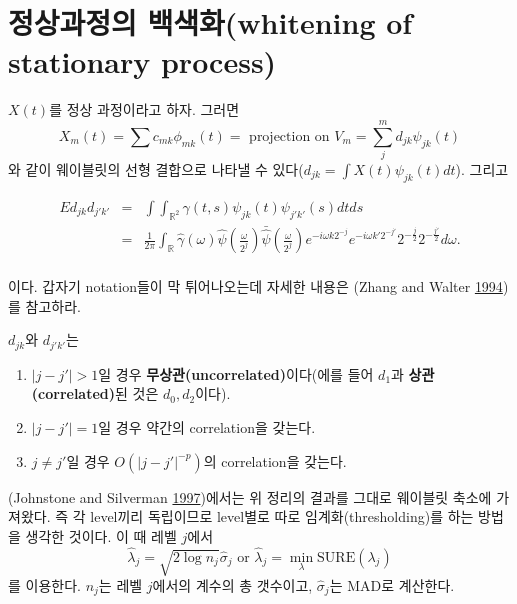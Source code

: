 \documentclass[b5paper,]{book}
\theoremstyle{definition}
\theoremstyle{definition}
\theoremstyle{definition}
\theoremstyle{remark}
\let\BeginKnitrBlock\begin \let\EndKnitrBlock\end
\begin{document}
\section{정상과정의 백색화(whitening of stationary
process)}\label{-whitening-of-stationary-process}

\(X(t)\)를 정상 과정이라고 하자. 그러면
\[X_{m}(t)=\sum c_{mk}\phi_{mk}(t)=\text{ projection on $V_{m}$}=\sum_{j}^{m}d_{jk}\psi_{jk}(t)\]
와 같이 웨이블릿의 선형 결합으로 나타낼 수
있다(\(d_{jk}=\int X(t)\psi_{jk}(t)dt\)). 그리고

\begin{eqnarray*}
E d_{jk}d_{j'k'}&=&\int \int_{\mathbb{R}^{2}}\gamma(t,s)\psi_{jk}(t)\psi_{j'k'}(s)dtds\\
&=&\frac{1}{2 \pi}\int_{\mathbb{R}}\hat{\gamma}(\omega)\hat{\psi}(\frac{\omega}{2^{j}})\bar{\hat{\psi}}(\frac{\omega}{2^{j}})e^{-i\omega k 2^{-j}}e^{-i\omega k' 2^{-j'}}2^{-\frac{j}{2}}2^{-\frac{j'}{2}}d\omega.\\
\end{eqnarray*}

이다. 갑자기 notation들이 막 튀어나오는데 자세한 내용은 (Zhang and
Walter \protect\hyperlink{ref-Zhang1994}{1994})를 참고하라.

\BeginKnitrBlock{theorem}[정상과정의 백색화]
\protect\hypertarget{thm:unnamed-chunk-142}{}{\label{thm:unnamed-chunk-142}
{} }\(d_{jk}\)와 \(d_{j'k'}\)는

\begin{enumerate}
\def\labelenumi{\arabic{enumi}.}
\item
  \(|j-j'|>1\)일 경우 \textbf{무상관(uncorrelated)}이다(에를 들어
  \(d_{1}\)과 \textbf{상관(correlated)}된 것은 \(d_{0}, d_{2}\)이다).
\item
  \(|j-j'|=1\)일 경우 약간의 correlation을 갖는다.
\item
  \(j \neq j'\)일 경우 \(O(|j-j'|^{-p})\)의 correlation을 갖는다.
\end{enumerate}
\EndKnitrBlock{theorem}

(Johnstone and Silverman
\protect\hyperlink{ref-Johnstone1997}{1997})에서는 위 정리의 결과를
그대로 웨이블릿 축소에 가져왔다. 즉 각 level끼리 독립이므로 level별로
따로 임계화(thresholding)를 하는 방법을 생각한 것이다. 이 때 레벨
\(j\)에서
\[\hat{\lambda}_{j}=\sqrt{2\log n_{j}}\hat{\sigma}_{j} \text{ or } \hat{\lambda}_{j}=\min_{\lambda}\text{SURE}(\lambda_{j})\]
를 이용한다. \(n_{j}\)는 레벨 \(j\)에서의 계수의 총 갯수이고,
\(\hat{\sigma}_{j}\)는 MAD로 계산한다.
\end{document}

